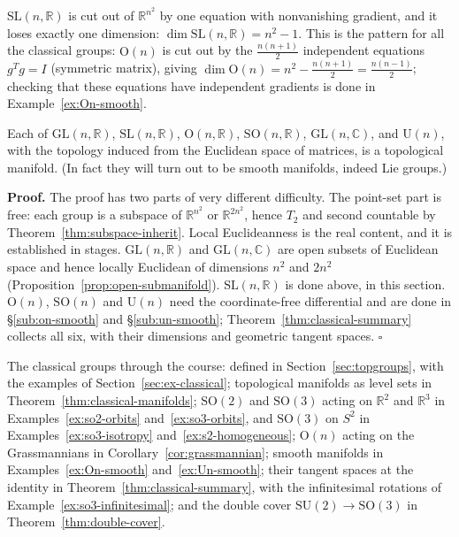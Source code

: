 \documentclass[11pt]{report}
\makeatletter
\newcounter{thmcounter}[section]
\renewenvironment{proof}[1][Proof]{\noindent\textbf{#1.} }{\hfill$\square$\par\vspace{5pt}}
\newcommand{\thmlabel}[1]{\edef\@currentlabel{\arabic{section}.\arabic{thmcounter}}\label{#1}}
\newcommand{\GL}{\mathrm{GL}}
\newcommand{\SL}{\mathrm{SL}}
\newcommand{\Ogp}{\mathrm{O}}
\newcommand{\SO}{\mathrm{SO}}
\newcommand{\Ugp}{\mathrm{U}}
\newcommand{\leeref}[1]{\par\smallskip{\raggedleft\footnotesize\textsc{Lee}:\ #1\par}}
\makeatother
\begin{document}
\begin{rembox}\label{rem:dimension-count}
$\SL(n,\mathbb{R})$ is cut out of $\mathbb{R}^{n^2}$ by one equation with nonvanishing gradient, and it loses exactly one dimension: $\dim \SL(n,\mathbb{R}) = n^2 - 1$. This is the pattern for all the classical groups: $\Ogp(n)$ is cut out by the $\tfrac{n(n+1)}{2}$ independent equations $g^T g = I$ (symmetric matrix), giving $\dim \Ogp(n) = n^2 - \tfrac{n(n+1)}{2} = \tfrac{n(n-1)}{2}$; checking that these equations have independent gradients is done in Example~\ref{ex:On-smooth}.
\end{rembox}
\begin{thmbox}\thmlabel{thm:classical-manifolds}
Each of $\GL(n,\mathbb{R})$, $\SL(n,\mathbb{R})$, $\Ogp(n,\mathbb{R})$, $\SO(n,\mathbb{R})$, $\GL(n,\mathbb{C})$, and $\Ugp(n)$, with the topology induced from the Euclidean space of matrices, is a topological manifold. (In fact they will turn out to be smooth manifolds, indeed Lie groups.)
\leeref{Examples 1.27 and 7.27--7.30}
\end{thmbox}

\begin{proof}
The proof has two parts of very different difficulty. The point-set part is free: each group is a subspace of $\mathbb{R}^{n^2}$ or $\mathbb{R}^{2n^2}$, hence $T_2$ and second countable by Theorem~\ref{thm:subspace-inherit}. Local Euclideanness is the real content, and it is established in stages. $\GL(n,\mathbb{R})$ and $\GL(n,\mathbb{C})$ are open subsets of Euclidean space and hence locally Euclidean of dimensions $n^2$ and $2n^2$ (Proposition~\ref{prop:open-submanifold}). $\SL(n,\mathbb{R})$ is done above, in this section. $\Ogp(n)$, $\SO(n)$ and $\Ugp(n)$ need the coordinate-free differential and are done in \S\ref{sub:on-smooth} and \S\ref{sub:un-smooth}; Theorem~\ref{thm:classical-summary} collects all six, with their dimensions and geometric tangent spaces.
\end{proof}

The classical groups through the course: defined in Section~\ref{sec:topgroups}, with the examples of Section~\ref{sec:ex-classical}; topological manifolds as level sets in Theorem~\ref{thm:classical-manifolds}; $\SO(2)$ and $\SO(3)$ acting on $\mathbb{R}^2$ and $\mathbb{R}^3$ in Examples~\ref{ex:so2-orbits} and~\ref{ex:so3-orbits}, and $\SO(3)$ on $S^2$ in Examples~\ref{ex:so3-isotropy} and~\ref{ex:s2-homogeneous}; $\Ogp(n)$ acting on the Grassmannians in Corollary~\ref{cor:grassmannian}; smooth manifolds in Examples~\ref{ex:On-smooth} and~\ref{ex:Un-smooth}; their tangent spaces at the identity in Theorem~\ref{thm:classical-summary}, with the infinitesimal rotations of Example~\ref{ex:so3-infinitesimal}; and the double cover $\mathrm{SU}(2) \to \SO(3)$ in Theorem~\ref{thm:double-cover}.
\end{document}
